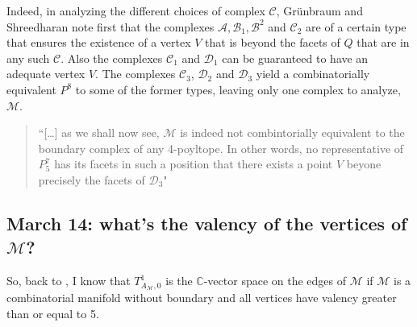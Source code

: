 Indeed, in analyzing the different choices of complex \(\mathcal{C}\), Grünbraum and Shreedharan note first that the complexes \(\mathcal{A},\mathcal{B}_1,\mathcal{B}^2 \) and \(\mathcal{C}_2\) are of a certain type that ensures the existence of a vertex \(V\) that is beyond the facets of \(Q\) that are in any such \(\mathcal{C}\). Also the complexes \(\mathcal{C}_1\) and \(\mathcal{D}_1\) can be guaranteed to have an adequate vertex \(V\). The complexes \(\mathcal{C}_3\), \(\mathcal{D}_2\) and \(\mathcal{D}_3\) yield a combinatorially equivalent \(P^8\) to some of the former types, leaving only one complex to analyze, \(\mathcal{M}\).
\begin{quotation}
	``[…] as we shall now see, \(\mathcal{M}\) is indeed not combintorially equivalent to the boundary complex of any 4-poyltope. In other words, no representative of \(P_5^7\) has its facets in such a position that there exists a point \(V\) beyone precisely the facets of \(\mathcal{D}_3\)"
\end{quotation}

\subsection{March 14: what's the valency of the vertices of \(\mathcal{M}\)?}

So, back to \cite{jan1}, I know that \(T^1_{A_{\mathcal{M}},0}\) is the \(\mathbb{C}\)-vector space on the edges of \(\mathcal{M}\) if \(\mathcal{M}\) is a combinatorial manifold without boundary and all vertices have valency greater than or equal to 5.

